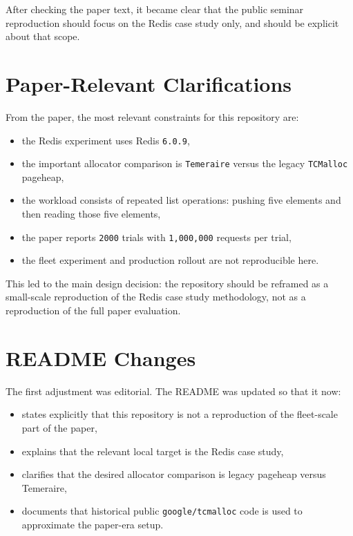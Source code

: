 \documentclass[a4paper,11pt]{article}
\begin{document}
After checking the paper text, it became clear that the public seminar reproduction should focus on the Redis case study only, and should be explicit about that scope.

\section{Paper-Relevant Clarifications}

From the paper, the most relevant constraints for this repository are:

\begin{itemize}[leftmargin=1.5em]
  \item the Redis experiment uses Redis \texttt{6.0.9},
  \item the important allocator comparison is \texttt{Temeraire} versus the legacy \texttt{TCMalloc} pageheap,
  \item the workload consists of repeated list operations: pushing five elements and then reading those five elements,
  \item the paper reports \texttt{2000} trials with \texttt{1,000,000} requests per trial,
  \item the fleet experiment and production rollout are not reproducible here.
\end{itemize}

This led to the main design decision: the repository should be reframed as a small-scale reproduction of the Redis case study methodology, not as a reproduction of the full paper evaluation.

\section{README Changes}

The first adjustment was editorial.
The README was updated so that it now:

\begin{itemize}[leftmargin=1.5em]
  \item states explicitly that this repository is not a reproduction of the fleet-scale part of the paper,
  \item explains that the relevant local target is the Redis case study,
  \item clarifies that the desired allocator comparison is legacy pageheap versus Temeraire,
  \item documents that historical public \texttt{google/tcmalloc} code is used to approximate the paper-era setup.
\end{itemize}
\end{document}

